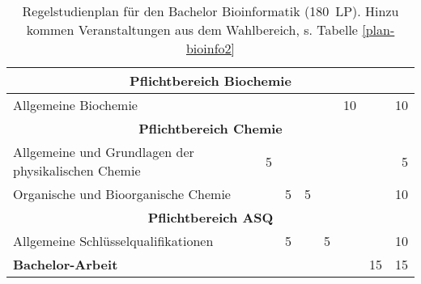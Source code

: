 \begin{table}[tbp]
\begin{small}
\begin{tabularx}{\textwidth}{|X||c|c|c|c|c|c||r|}
    \multicolumn{8}{|c|}{\textbf{Pflichtbereich Biochemie}}\\\hline
    Allgemeine Biochemie&&&&&10&&10\\\hline\hline
    \multicolumn{8}{|c|}{\textbf{Pflichtbereich Chemie}}\\\hline
    Allgemeine und Grundlagen der physikalischen Chemie&5&&&&&&5\\\hline
    Organische und Bioorganische Chemie&&5&5&&&&10\\\hline\hline
    \multicolumn{8}{|c|}{\textbf{Pflichtbereich ASQ}}\\\hline
    Allgemeine Schlüsselqualifikationen&&5&&5&&&10\\\hline\hline
    \textbf{Bachelor-Arbeit}&&&&&&15&15\\\hline
    \end{tabularx}
    \end{small}
    \caption{Regelstudienplan für den Bachelor Bioinformatik (180~LP). Hinzu kommen Veranstaltungen aus dem Wahlbereich, s. Tabelle \ref{plan-bioinfo2} \label{plan-bioinfo}}
\end{table}

